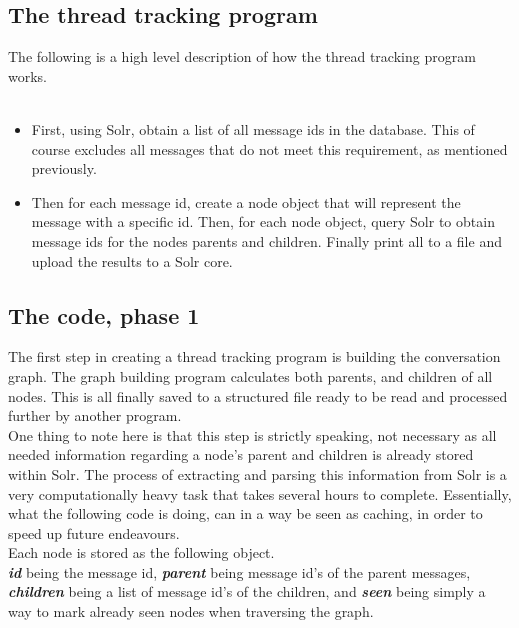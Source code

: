 \documentclass[a4paper,english]{report}
\begin{document}
\subsection{The thread tracking program} 

The following is a high level description of how the thread tracking program works.\\\\

\begin{itemize}
\item First, using Solr, obtain a list of all message ids in the database. This of course excludes all messages that do not meet this requirement, as mentioned previously.\\

\item Then for each message id, create a node object that will represent the message with a specific id. Then, for each node object, query Solr to obtain message ids for the nodes parents and children. Finally print all to a file and upload the results to a Solr core.\\
\end{itemize}


\subsection{The code, phase 1}

The first step in creating a thread tracking program is building the conversation graph. The graph building program calculates both parents, and children of all nodes. This is all finally saved to a structured file ready to be read and processed further by another program.\\

One thing to note here is that this step is strictly speaking, not necessary as all needed information regarding a node's parent and children is already stored within Solr. The process of extracting and parsing this information from Solr is a very computationally heavy task that takes several hours to complete. Essentially, what the following code is doing, can in a way be seen as caching, in order to speed up future endeavours.\\

Each node is stored as the following object.\\




\textbf{\textit{id}} being the message id, \textbf{\textit{parent}} being message id’s of the parent messages, \textbf{\textit{children}} being a list of message id’s of the children, and \textbf{\textit{seen}} being simply a way to mark already seen nodes when traversing the graph.
\end{document}
